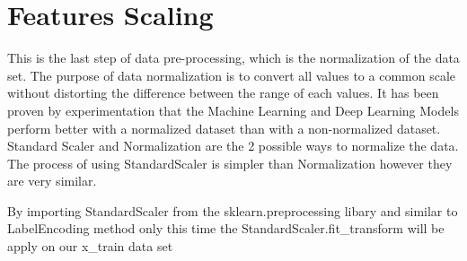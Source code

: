 \section{Features Scaling} %
\label{sec:inserting_tables}
\hspace{10px} This is the last step of data pre-processing, which is the normalization of the data set. The purpose of data normalization is to convert all values to a common scale without distorting the difference between the range of each values. It has been proven by experimentation that the Machine Learning and Deep Learning Models perform better with a normalized dataset than with a non-normalized dataset. Standard Scaler and Normalization are the 2 possible ways to normalize the data. The process of using StandardScaler is simpler than Normalization however they are very similar.

By importing StandardScaler from the  sklearn.preprocessing libary and similar to LabelEncoding method only this time the StandardScaler.fit\_transform will be apply on our x\_train data set
